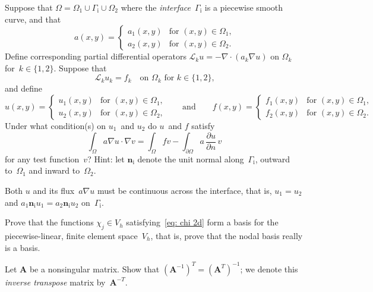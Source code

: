 \begin{Exercises}
\exercise
Suppose that $\Omega=\Omega_1\cup\Gamma_{\mathrm{i}}\cup\Omega_2$ where the 
\emph{interface}~$\Gamma_{\mathrm{i}}$ is a piecewise smooth curve, and that
\[
a(x,y)=\begin{cases}
a_1(x,y)&\text{for $(x,y)\in\Omega_1$,}\\
a_2(x,y)&\text{for $(x,y)\in\Omega_2$.}
\end{cases}
\]
Define corresponding partial differential operators
$\mathcal{L}_ku=-\nabla\cdot(a_k\nabla u)$ on $\Omega_k$ for~$k\in\{1,2\}$.
Suppose that
\[
\mathcal{L}_ku_k=f_k\quad\text{on $\Omega_k$ for $k\in\{1,2\}$,}
\]
and define
\[
u(x,y)=\begin{cases}
u_1(x,y)&\text{for $(x,y)\in\Omega_1$,}\\
u_2(x,y)&\text{for $(x,y)\in\Omega_2$,}
\end{cases}
\qquad\text{and}\qquad
f(x,y)=\begin{cases}
f_1(x,y)&\text{for $(x,y)\in\Omega_1$,}\\
f_2(x,y)&\text{for $(x,y)\in\Omega_2$.}
\end{cases}
\]
Under what condition(s) on $u_1$~and $u_2$ do $u$~and $f$ satisfy
\[
\int_\Omega a\nabla u\cdot\nabla v
    =\int_\Omega fv
    -\int_{\partial\Omega}a\,\frac{\partial u}{\partial n}\,v
\]
for any test function~$v$?  Hint: let $\boldsymbol{n}_{\mathrm{i}}$ denote the 
unit normal along~$\Gamma_{\mathrm{i}}$, outward to~$\Omega_1$ and inward 
to~$\Omega_2$.
\begin{ans}
Both $u$ and its flux~$a\nabla u$ must be continuous across the interface, that 
is, $u_1=u_2$ and 
$a_1\boldsymbol{n}_{\mathrm{i}}u_1=a_2\boldsymbol{n}_{\mathrm{i}}u_2$ 
on~$\Gamma_{\mathrm{i}}$.
\end{ans}


\exercise\label{ex: nodal basis}
Prove that the functions $\chi_j\in V_h$ satisfying~\eqref{eq: chi 2d} form a 
basis for the piecewise-linear, finite element space~$V_h$, that is, prove that 
the nodal basis really is a basis. 

\exercise\label{ex: inv transpose}
Let $\boldsymbol{A}$ be a nonsingular matrix.
Show that $(\boldsymbol{A}^{-1})^T=(\boldsymbol{A}^T)^{-1}$; we denote this 
\emph{inverse transpose} matrix by~$\boldsymbol{A}^{-T}$.


\end{Exercises}
